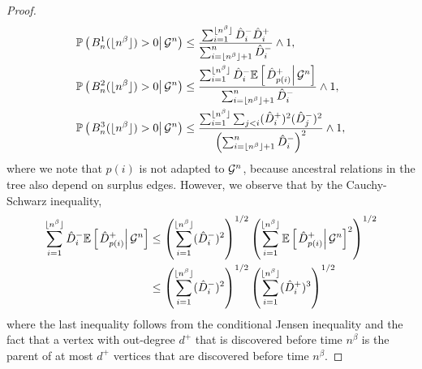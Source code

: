 \begin{proof}
\begin{align*}{\mathbb P}\left(\left.B^1_n(\lfloor n^\beta \rfloor)>0\right| {\mathcal G}^n \right)&\leq \frac{\sum_{i=1}^{\lfloor n^\beta \rfloor} \hat{D}^-_i\hat{D}^+_i}{\sum_{i=\lfloor n^\beta \rfloor+1}^n \hat{D}^-_i}\wedge 1,\\
{\mathbb P}\left(\left.B^2_n(\lfloor n^\beta \rfloor)>0\right| {\mathcal G}^n \right)&\leq \frac{\sum_{i=1}^{\lfloor n^\beta \rfloor} \hat{D}^-_i{\mathbb E}\left[\left.\hat{D}^+_{p(i)}\right|{\mathcal G}^n\right]}{\sum_{i=\lfloor n^\beta \rfloor+1}^n \hat{D}^-_i}\wedge 1,\\
{\mathbb P}\left(\left.B^3_n(\lfloor n^\beta \rfloor)>0\right| {\mathcal G}^n \right)&\leq \frac{\sum_{i=1}^{\lfloor n^\beta \rfloor}\sum_{j<i} (\hat{D}^+_i)^2 (\hat{D}^-_j)^2 }{\left(\sum_{i=\lfloor n^\beta \rfloor+1}^n \hat{D}^-_i\right)^2 }\wedge 1,\end{align*}
where we note that $p(i)$ is not adapted to ${\mathcal G}^n$, because ancestral relations in the tree also depend on surplus edges. However, we observe that by the Cauchy-Schwarz inequality,
\begin{align*}\sum_{i=1}^{\lfloor n^\beta \rfloor} \hat{D}^-_i{\mathbb E}\left[\left.\hat{D}^+_{p(i)}\right|{\mathcal G}^n\right]&\leq \left(\sum_{i=1}^{\lfloor n^\beta \rfloor} (\hat{D}^-_i)^2\right)^{1/2}\left(\sum_{i=1}^{\lfloor n^\beta \rfloor} {\mathbb E}\left[\left.\hat{D}^+_{p(i)}\right|{\mathcal G}^n\right]^2\right)^{1/2}\\
&\leq\left(\sum_{i=1}^{\lfloor n^\beta \rfloor} (\hat{D}^-_i)^2\right)^{1/2}\left(\sum_{i=1}^{\lfloor n^\beta \rfloor} (\hat{D}^+_i)^3\right)^{1/2}\end{align*}
where the last inequality follows from the conditional Jensen inequality and the fact that a vertex with out-degree $d^+$ that is discovered before time $n^\beta$ is the parent of at most $d^+$ vertices that are discovered before time $n^\beta$.


\end{proof}
